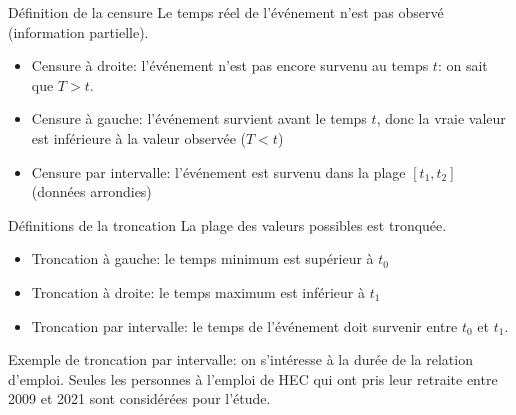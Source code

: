 \documentclass[
  ignorenonframetext,
]{beamer}
\providecommand{\tightlist}{%
  \setlength{\itemsep}{0pt}\setlength{\parskip}{0pt}}\usepackage{longtable,booktabs,array}
\begin{document}
\begin{frame}{Définition de la censure}
\protect\hypertarget{duxe9finition-de-la-censure}{}
Le temps réel de l'événement n'est pas observé (information partielle).

\begin{itemize}
\tightlist
\item
  Censure à droite: l'événement n'est pas encore survenu au temps \(t\):
  on sait que \(T > t\).
\item
  Censure à gauche: l'événement survient avant le temps \(t\), donc la
  vraie valeur est inférieure à la valeur observée (\(T < t\))
\item
  Censure par intervalle: l'événement est survenu dans la plage
  \([t_1, t_2]\) (données arrondies)
\end{itemize}
\end{frame}

\begin{frame}{Définitions de la troncation}
\protect\hypertarget{duxe9finitions-de-la-troncation}{}
La plage des valeurs possibles est tronquée.

\begin{itemize}
\tightlist
\item
  Troncation à gauche: le temps minimum est supérieur à \(t_0\)
\item
  Troncation à droite: le temps maximum est inférieur à \(t_1\)
\item
  Troncation par intervalle: le temps de l'événement doit survenir entre
  \(t_0\) et \(t_1\).
\end{itemize}

Exemple de troncation par intervalle: on s'intéresse à la durée de la
relation d'emploi. Seules les personnes à l'emploi de HEC qui ont pris
leur retraite entre 2009 et 2021 sont considérées pour l'étude.
\end{frame}
\end{document}
